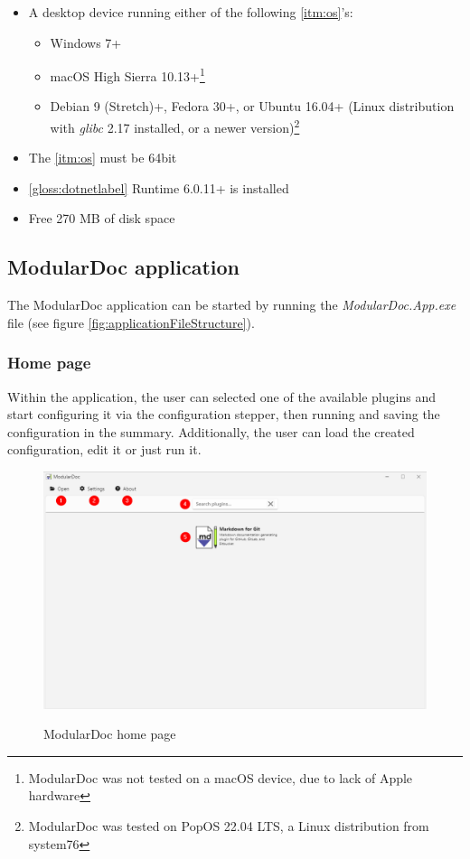 \begin{itemize}
    \item A desktop device running either of the following \ref{itm:os}'s:
    \begin{itemize}
        \item Windows 7+
        \item macOS High Sierra 10.13+\footnote{ModularDoc was not tested on a macOS device, due to lack of Apple hardware}
        \item  Debian 9 (Stretch)+, Fedora 30+, or Ubuntu 16.04+ (Linux distribution with \textit{glibc} 2.17 installed, or a newer version)\footnote{ModularDoc was tested on PopOS 22.04 LTS, a Linux distribution from system76}
    \end{itemize}
    \item The \ref{itm:os} must be 64bit
    \item \ref{gloss:dotnetlabel} Runtime 6.0.11+ is installed
    \item Free 270 MB of disk space
\end{itemize}

\subsection{ModularDoc application}

The ModularDoc application can be started by running the \textit{ModularDoc.App.exe} file (see figure \ref{fig:applicationFileStructure}).

\subsubsection{Home page}

Within the application, the user can selected one of the available plugins and start configuring it via the configuration stepper, then running and saving the configuration in the summary.
Additionally, the user can load the created configuration, edit it or just run it.

\begin{figure}[H]
    \includegraphics[width=\linewidth]{img/modularDocHomePage.png}
    \label{fig:modularDocHome}
    \caption{ModularDoc home page}
\end{figure}

